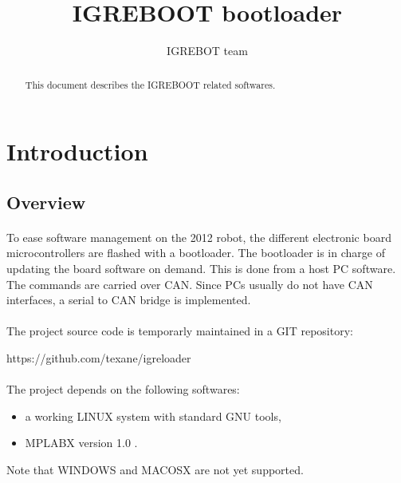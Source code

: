 \documentclass[a4paper, 11pt]{article}
\begin{document}
\title{IGREBOOT bootloader}
\author{IGREBOT team}
\date{}

\maketitle


\newpage
\tableofcontents
{}


\newpage
\begin{abstract}
This document describes the IGREBOOT related softwares.
\end{abstract}


\newpage
\section{Introduction}

\subsection{Overview}
\paragraph{}
To ease software management on the 2012 robot, the different electronic board
microcontrollers are flashed with a bootloader. The bootloader is in charge
of updating the board software on demand. This is done from a host PC software.
The commands are carried over CAN. Since PCs usually do not have CAN interfaces,
a serial to CAN bridge is implemented.

\paragraph{}
The project source code is temporarly maintained in a GIT repository:
\begin{center}
https://github.com/texane/igreloader
\end{center}

\paragraph{}
The project depends on the following softwares:
\begin{itemize}
\item a working LINUX system with standard GNU tools,
\item MPLABX version 1.0 .
\end{itemize}
Note that WINDOWS and MACOSX are not yet supported.
\end{document}
